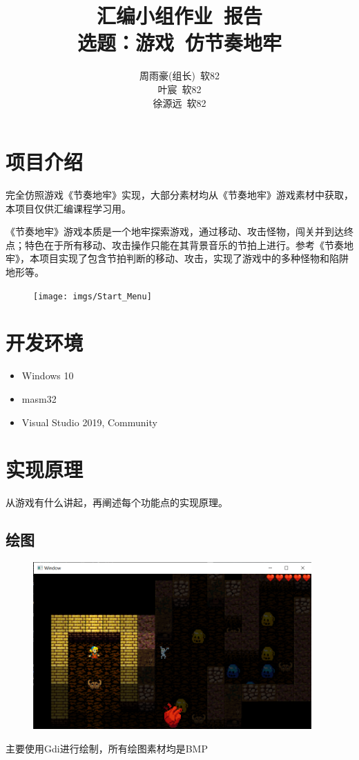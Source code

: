 \documentclass[11pt,a4paper]{article}	%
\title{\textbf{汇编小组作业\ 报告}\\ 选题：游戏\ 仿节奏地牢}
\author{周雨豪(组长)\ 软82\\ 叶宸\ 软82\\ 徐源远\ 软82}
\date{}
\begin{document}
	\maketitle
	\renewcommand{\baselinestretch}{1.2}\normalsize	%
	\setlength{\parindent}{0mm}	%
	\setlength{\abovedisplayskip}{1pt}	%
	\setlength{\belowdisplayskip}{1pt}	%
	\setlength{\parskip}{0\baselineskip}
	\renewcommand{\headrulewidth}{0mm}	%
	\makeatletter
	\let\@afterindentfalse\@afterindenttrue
	\@afterindenttrue
	\makeatother
	\setlength{\parindent}{2em}%


\section{项目介绍}
完全仿照游戏《节奏地牢》实现，大部分素材均从《节奏地牢》游戏素材中获取，本项目仅供汇编课程学习用。

《节奏地牢》游戏本质是一个地牢探索游戏，通过移动、攻击怪物，闯关并到达终点；特色在于所有移动、攻击操作只能在其背景音乐的节拍上进行。参考《节奏地牢》，本项目实现了包含节拍判断的移动、攻击，实现了游戏中的多种怪物和陷阱地形等。
\begin{figure}[htbp]
	\centering
	\texttt{[image: imgs/Start\_Menu]}
\end{figure}
\section{开发环境}
\begin{itemize}
	\item Windows 10
	\item masm32
	\item Visual Studio 2019, Community
\end{itemize}
\newpage
\section{实现原理}
从游戏有什么讲起，再阐述每个功能点的实现原理。
\subsection{绘图}
\begin{figure}[htbp]
	\includegraphics[width=0.95\textwidth]{imgs/1}
\end{figure}
主要使用Gdi进行绘制，所有绘图素材均是BMP
\end{document}
